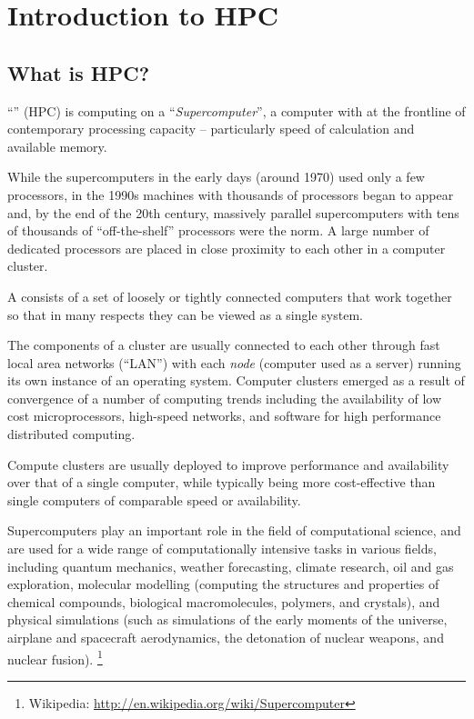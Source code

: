 \chapter{Introduction to HPC}
\label{ch:introduction-to-hpc}

\section{What is HPC?}
\label{sec:what-is-hpc}

``'' (HPC) is computing on a
``\emph{Supercomputer}'', a computer with at the frontline of contemporary
processing capacity -- particularly speed of calculation and available memory.

While the supercomputers in the early days (around 1970) used only a few
processors, in the 1990s machines with thousands of processors began to appear
and, by the end of the 20th century, massively parallel supercomputers with
tens of thousands of ``off-the-shelf'' processors were the norm. A large number
of dedicated processors are placed in close proximity to each other in a
computer cluster.

A  consists of a set of loosely or tightly connected
computers that work together so that in many respects they can be viewed as a
single system.

The components of a cluster are usually connected to each other through fast
local area networks (``LAN'') with each \emph{node} (computer used as a
server) running its own instance of an operating system. Computer clusters
emerged as a result of convergence of a number of computing trends including
the availability of low cost microprocessors, high-speed networks, and software
for high performance distributed computing.

Compute clusters are usually deployed to improve performance and availability
over that of a single computer, while typically being more cost-effective
than single computers of comparable speed or availability.

Supercomputers play an important role in the field of computational science,
and are used for a wide range of computationally intensive tasks in various
fields, including quantum mechanics, weather forecasting, climate research, oil
and gas exploration, molecular modelling (computing the structures and
properties of chemical compounds, biological macromolecules, polymers, and
crystals), and physical simulations (such as simulations of the early moments
of the universe, airplane and spacecraft aerodynamics, the detonation of
nuclear weapons, and nuclear fusion).
\footnote{Wikipedia: \url{http://en.wikipedia.org/wiki/Supercomputer}}

